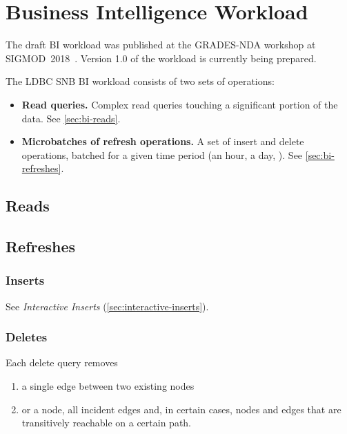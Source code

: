 \chapter{Business Intelligence Workload}
\label{sec:bi}

The draft BI workload was published at the \mbox{GRADES-NDA} workshop at \mbox{SIGMOD 2018}~\cite{DBLP:conf/grades/SzarnyasPAMPKEB18}.
Version 1.0 of the workload is currently being prepared.

The LDBC SNB BI workload consists of two sets of operations:

\begin{itemize}
\item \textbf{Read queries.} Complex read queries touching a significant portion of the data. See \autoref{sec:bi-reads}.
\item \textbf{Microbatches of refresh operations.} A set of insert and delete operations, batched for a given time period (\eg an hour, a day, \etc). See \autoref{sec:bi-refreshes}.
\end{itemize}


\section{Reads}
\label{sec:bi-reads}




\section{Refreshes}
\label{sec:bi-refreshes}

\subsection{Inserts}
\label{sec:bi-inserts}

See \emph{Interactive Inserts} (\autoref{sec:interactive-inserts}).

\subsection{Deletes}
\label{sec:bi-deletes}

Each delete query removes

\begin{enumerate}
    \item a single edge between two existing nodes
    \item or a node, all incident edges and, in certain cases, nodes and edges that are transitively reachable on a certain path.
\end{enumerate}



